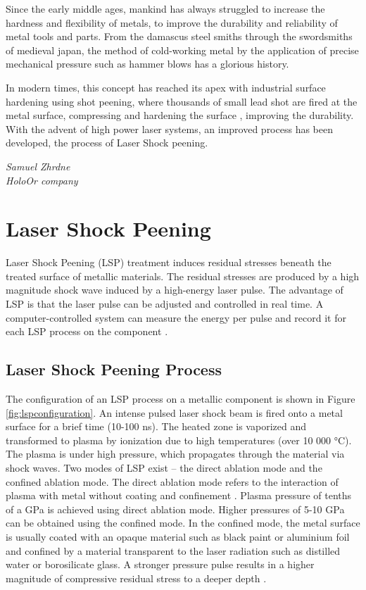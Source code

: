 \epigraph{Since the early middle ages, mankind has always struggled to increase the hardness and flexibility of metals, to improve the durability and reliability of  metal tools and parts. From the damascus steel smiths through the swordsmiths of medieval japan, the method of cold-working metal by the application of precise mechanical pressure such as hammer blows has a glorious history.

In modern times, this concept has reached its apex with industrial surface hardening using shot peening, where thousands of small lead shot are fired at the metal surface, compressing and hardening the surface , improving the durability. With the advent of high power laser systems, an improved process has been developed, the process of Laser Shock peening.}{\textit{Samuel Zhrdne\\ HoloOr company}}

\section{Laser Shock Peening}

Laser Shock Peening (LSP) treatment induces residual stresses beneath the treated surface of metallic materials. The residual stresses are produced by a high magnitude shock wave induced by a high-energy laser pulse. The advantage of LSP is that the laser pulse can be adjusted and controlled in real time. A computer-controlled system can measure the energy per pulse and record it for each LSP process on the component \cite{mannava}.

\subsection{Laser Shock Peening Process}
The configuration of an LSP process on a metallic component is shown in Figure \ref{fig:lspconfiguration}. An intense pulsed laser shock beam is fired onto a metal surface for a brief time (10-100 ns). The heated zone is vaporized and transformed to plasma by ionization due to high temperatures (over 10 000 °C). The plasma is under high pressure, which propagates through the material via shock waves. Two modes of LSP exist – the direct ablation mode and the confined ablation mode. The direct ablation mode refers to the interaction of plasma with metal without coating and confinement \cite{sano}. Plasma pressure of tenths of a GPa is achieved using direct ablation mode. Higher pressures of 5-10 GPa can be obtained using the confined mode. In the confined mode, the metal surface is usually coated with an opaque material such as black paint or aluminium foil and confined by a material transparent to the laser radiation such as distilled water or borosilicate glass. A stronger pressure pulse results in a higher magnitude of compressive residual stress to a deeper depth \cite{fairland}.

